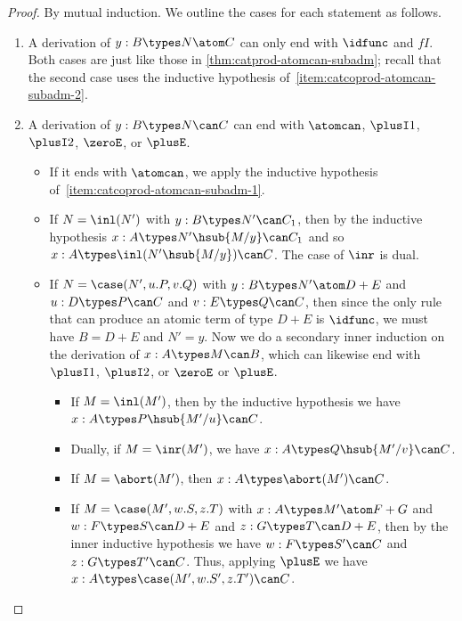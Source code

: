 \begin{proof}
  By mutual induction.
  We outline the cases for each statement as follows.
  \begin{enumerate}
  \item A derivation of $y:B\types N\atom C$ can only end with $\idfunc$ and $fI$.
    Both cases are just like those in \cref{thm:catprod-atomcan-subadm};
    recall that the second case uses the inductive hypothesis of~\ref{item:catcoprod-atomcan-subadm-2}.
  \item A derivation of $y:B\types N\can C$ can end with $\atomcan$, $\plusI1$, $\plusI2$, $\zeroE$, or $\plusE$.
    \begin{itemize}
    \item If it ends with $\atomcan$, we apply the inductive hypothesis of~\ref{item:catcoprod-atomcan-subadm-1}.
    \item If $N=\inl(N')$ with $y:B\types N'\can C_1$, then by the inductive hypothesis $x:A\types N'\hsub{M/y}\can C_1$ and so $x:A\types \inl(N'\hsub{M/y})\can C$.
      The case of $\inr$ is dual.
    \item If $N=\case(N',u.P,v.Q)$ with $y:B\types N'\atom D+E$ and $u:D\types P\can C$ and $v:E\types Q\can C$, then since the only rule that can produce an atomic term of type $D+E$ is $\idfunc$, we must have $B=D+E$ and $N'=y$.
      Now we do a secondary inner induction on the derivation of $x:A\types M\can B$, which can likewise end with $\plusI1$, $\plusI2$, or $\zeroE$ or $\plusE$.
      \begin{itemize}
      \item If $M=\inl(M')$, then by the inductive hypothesis we have $x:A\types P\hsub{M'/u}\can C$.
      \item Dually, if $M=\inr(M')$, we have $x:A\types Q\hsub{M'/v}\can C$.
      \item If $M=\abort(M')$, then $x:A\types \abort(M')\can C$.
      \item If $M=\case(M',w.S,z.T)$ with $x:A\types M'\atom F+G$ and $w:F\types S\can D+E$ and $z:G\types T\can D+E$, then
        by the inner inductive hypothesis we have $w:F\types S'\can C$ and $z:G\types T'\can C$.
        Thus, applying $\plusE$ we have $x:A\types \case(M',w.S',z.T')\can C$.
      \end{itemize}

\end{itemize}
\end{enumerate}
\end{proof}
